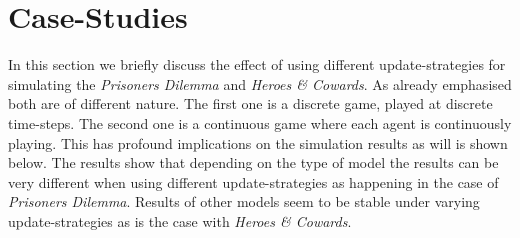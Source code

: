 \section{Case-Studies}
In this section we briefly discuss the effect of using different update-strategies for simulating the \textit{Prisoners Dilemma} and \textit{Heroes \& Cowards}. As already emphasised both are of different nature. The first one is a discrete game, played at discrete time-steps. The second one is a continuous game where each agent is continuously playing. This has profound implications on the simulation results as will is shown below. The results show that depending on the type of model the results can be very different when using different update-strategies as happening in the case of \textit{Prisoners Dilemma}. Results of other models seem to be stable under varying update-strategies as is the case with \textit{Heroes \& Cowards}.

